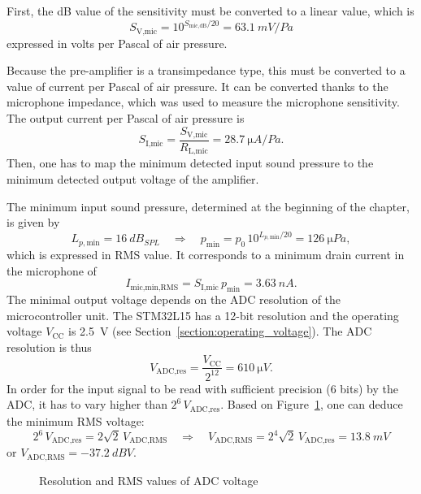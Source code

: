 \documentclass{EPL-master-thesis-covers-EN}
\newcommand{\te}[1]{\textrm{#1}}
\begin{document}
First, the dB value of the sensitivity must be converted to a linear value, which is
\[
 S_{\te{V,mic}} = 10^{S_{\te{mic,dB}}/20} = \SI{63.1}{mV/Pa}
\]
expressed in volts per Pascal of air pressure.

Because the pre-amplifier is a transimpedance type, this must be converted to a value of current per Pascal of air pressure. It can be converted thanks to the microphone impedance, which was used to measure the microphone sensitivity. The output current per Pascal of air pressure is
\[
 S_{\te{I,mic}} = \frac{S_{\te{V,mic}}}{R_{\te{L,mic}}} = \SI{28.7}{\micro A/Pa}.
\]
Then, one has to map the minimum detected input sound pressure to the minimum detected output voltage of the amplifier.

The minimum input sound pressure, determined at the beginning of the chapter, is given by
\[
 L_{p,\te{min}} = \SI{16}{dB_{SPL}} \quad \Rightarrow \quad p_\te{min} = p_0 \, 10^{L_{p,\te{min}}/20} = \SI{126}{\micro Pa},
\]
which is expressed in RMS value. It corresponds to a minimum drain current in the microphone of 
\[
 I_{\te{mic,min,RMS}} = S_{\te{I,mic}} \, p_\te{min} = \SI{3.63}{nA}.
\]
The minimal output voltage depends on the ADC resolution of the microcontroller unit. The STM32L15 has a 12-bit resolution and the operating voltage $V_\te{CC}$ is \SI{2.5}{V} (see Section~\ref{section:operating_voltage}). The ADC resolution is thus
\[
 V_{\te{ADC,res}} = \frac{V_\te{CC}}{2^{12}} = \SI{610}{\micro V}.
\]
In order for the input signal to be read with sufficient precision (6 bits) by the ADC, it has to vary higher than $2^6 \,V_{\te{ADC,res}}$. Based on Figure~\ref{fig:ADC_res}, one can deduce the minimum RMS voltage:
\[
 2^6 \, V_{\te{ADC,res}} = 2 \sqrt{2} \, V_\te{ADC,RMS} \quad \Rightarrow \quad V_\te{ADC,RMS} = 2^4 \sqrt{2} \, V_{\te{ADC,res}} = \SI{13.8}{mV}
\]
or $V_{\te{ADC,RMS}} = \SI{-37.2}{dBV}$.

\begin{figure}[H]
\centering
{}
\caption{Resolution and RMS values of ADC voltage}
\label{fig:ADC_res}
\end{figure}
\end{document}
